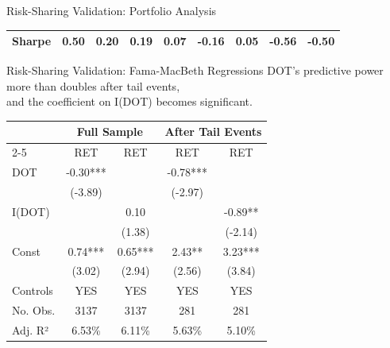 \documentclass[11pt, aspectratio=169]{beamer}
\begin{document}
\begin{frame}{Risk-Sharing Validation: Portfolio Analysis}
{\begin{tabular}{lcccccccc}
Sharpe & 0.50 & 0.20 & 0.19 & 0.07 & -0.16 & 0.05 & -0.56 & -0.50 \\ \hline
\end{tabular}
}
\end{frame}

\begin{frame}{Risk-Sharing Validation: Fama-MacBeth Regressions}
\centering
DOT’s predictive power more than \alert{doubles} after tail events, \\
and the coefficient on I(DOT) becomes \alert{significant}. \\
\bigskip
\begin{tabular}{lcccc}
\hline
\multicolumn{1}{c}{} & \multicolumn{2}{c}{Full Sample} & \multicolumn{2}{c}{After Tail Events} \\ \cline{2-5} 
 & RET & RET & RET & RET \\ \hline
DOT & -0.30*** &  & -0.78*** &  \\
 & (-3.89) &  & (-2.97) &  \\
I(DOT) &  & \cellcolor[HTML]{FFCE93}0.10 &  & \cellcolor[HTML]{FFCE93}-0.89** \\
 &  & \cellcolor[HTML]{FFCE93}(1.38) &  & \cellcolor[HTML]{FFCE93}(-2.14) \\
Const & \cellcolor[HTML]{FFCE93}0.74*** & 0.65*** & \cellcolor[HTML]{FFCE93}2.43** & 3.23*** \\
 & \cellcolor[HTML]{FFCE93}(3.02) & (2.94) & \cellcolor[HTML]{FFCE93}(2.56) & (3.84) \\ \hline
Controls & YES & YES & YES & YES \\
No. Obs. & 3137 & 3137 & 281 & 281 \\
Adj. R² & 6.53\% & 6.11\% & 5.63\% & 5.10\% \\ \hline
\end{tabular}\\
\end{frame}
\end{document}
